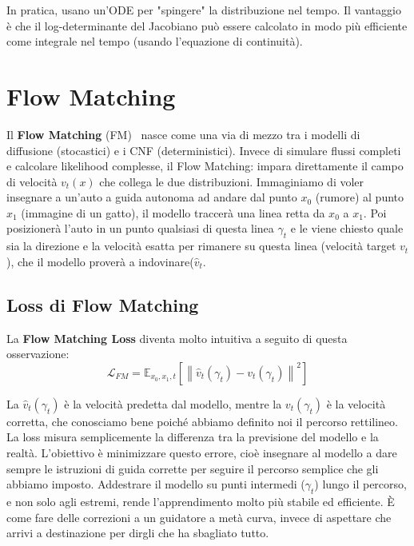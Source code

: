 In pratica, usano un’ODE per "spingere" la distribuzione nel tempo. Il vantaggio è che il log-determinante del Jacobiano può essere calcolato in modo più efficiente come integrale nel tempo (usando l’equazione di continuità).

\section{Flow Matching}
Il \textbf{Flow Matching} (FM)~\cite{lipman2023flow} nasce come una via di mezzo tra i modelli di diffusione (stocastici) e i CNF (deterministici). Invece di simulare flussi completi e calcolare likelihood complesse, il Flow Matching: impara direttamente il campo di velocità $v_t(x)$ che collega le due distribuzioni. Immaginiamo di voler insegnare a un'auto a guida autonoma ad andare dal punto $x_0$ (rumore) al punto $x_1$ (immagine di un gatto), il modello traccerà una linea retta da $x_0$ a $x_1$. Poi posizionerà l'auto in un punto qualsiasi di questa linea $\gamma_t$ e le viene chiesto quale sia la direzione e la velocità esatta per rimanere su questa linea (velocità target $v_t$), che il modello proverà a indovinare($\hat{v}_t$.

\subsection{Loss di Flow Matching}
La \textbf{Flow Matching Loss} diventa molto intuitiva a seguito di questa osservazione:
\begin{equation}
    \mathcal{L}_{FM} = \mathbb{E}_{x_0,x_1,t} \left[ \left\| \hat{v}_t(\gamma_t) - v_t(\gamma_t) \right\|^2 \right]
\end{equation}

La $\hat{v}_t(\gamma_t)$ è la velocità predetta dal modello, mentre la $v_t(\gamma_t)$ è la velocità corretta, che conosciamo bene poiché abbiamo definito noi il percorso rettilineo. La loss misura semplicemente la differenza tra la previsione del modello e la realtà. L'obiettivo è minimizzare questo errore, cioè insegnare al modello a dare sempre le istruzioni di guida corrette per seguire il percorso semplice che gli abbiamo imposto. Addestrare il modello su punti intermedi ($\gamma_t$) lungo il percorso, e non solo agli estremi, rende l'apprendimento molto più stabile ed efficiente. È come fare delle correzioni a un guidatore a metà curva, invece di aspettare che arrivi a destinazione per dirgli che ha sbagliato tutto.

